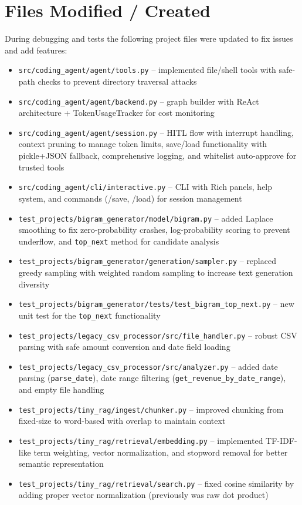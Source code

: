 \documentclass[12pt, a4paper]{article}
\begin{document}
\section{Files Modified / Created}
During debugging and tests the following project files were updated to fix issues and add features:
\begin{itemize}
  \item \texttt{src/coding\_agent/agent/tools.py} -- implemented file/shell tools with safe-path checks to prevent directory traversal attacks
  \item \texttt{src/coding\_agent/agent/backend.py} -- graph builder with ReAct architecture + TokenUsageTracker for cost monitoring
  \item \texttt{src/coding\_agent/agent/session.py} -- HITL flow with interrupt handling, context pruning to manage token limits, save/load functionality with pickle+JSON fallback, comprehensive logging, and whitelist auto-approve for trusted tools
  \item \texttt{src/coding\_agent/cli/interactive.py} -- CLI with Rich panels, help system, and commands (/save, /load) for session management
  \item \texttt{test\_projects/bigram\_generator/model/bigram.py} -- added Laplace smoothing to fix zero-probability crashes, log-probability scoring to prevent underflow, and \texttt{top\_next} method for candidate analysis
  \item \texttt{test\_projects/bigram\_generator/generation/sampler.py} -- replaced greedy sampling with weighted random sampling to increase text generation diversity
  \item \texttt{test\_projects/bigram\_generator/tests/test\_bigram\_top\_next.py} -- new unit test for the \texttt{top\_next} functionality
  \item \texttt{test\_projects/legacy\_csv\_processor/src/file\_handler.py} -- robust CSV parsing with safe amount conversion and date field loading
  \item \texttt{test\_projects/legacy\_csv\_processor/src/analyzer.py} -- added date parsing (\texttt{parse\_date}), date range filtering (\texttt{get\_revenue\_by\_date\_range}), and empty file handling
  \item \texttt{test\_projects/tiny\_rag/ingest/chunker.py} -- improved chunking from fixed-size to word-based with overlap to maintain context
  \item \texttt{test\_projects/tiny\_rag/retrieval/embedding.py} -- implemented TF-IDF-like term weighting, vector normalization, and stopword removal for better semantic representation
  \item \texttt{test\_projects/tiny\_rag/retrieval/search.py} -- fixed cosine similarity by adding proper vector normalization (previously was raw dot product)
\end{itemize}
\end{document}
